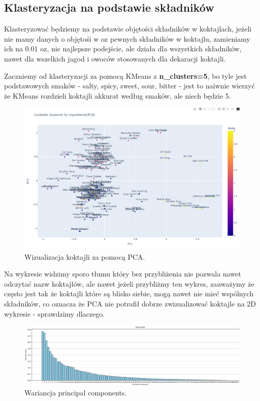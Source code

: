 \documentclass{article}
\begin{document}
\subsection{Klasteryzacja na podstawie składników}
Klasteryzować będziemy na podstawie objętości składników w koktajlach, jeżeli nie mamy danych o objętośi w oz pewnych składników w koktajlu, zamieniamy ich na 0.01 oz, nie najlepsze podejście, ale działa dla wszystkich składników, nawet dla wszelkich jagod i owoców stosowanych dla dekaracji koktajli.

\newline

Zaczniemy od klasteryzacji za pomocą KMeans z \textbf{n\_clusters=5}, bo tyle jest podstawowych smaków - salty, spicy, sweet, sour, bitter - jest to naiwnie wierzyć że KMeans rozdzieli koktajli akkurat według smaków, ale niech będzie 5.
\begin{figure}[h]
\centering
    \includegraphics[width=1\linewidth]{cluster_1.png}
    \caption{Wizualizacja koktajli za pomocą PCA.}
\end{figure}

Na wykresie widzimy sporo tłumu który bez przybliżenia nie pozwala nawet odczytać nazw koktajlów, ale nawet jeżeli przybliżmy ten wykres, zauważymy że często jest tak że koktajli które są blisko siebie, mogą nawet nie mieć wspólnych składników, co oznacza że PCA nie potrafił dobrze zwizualizować koktajle na 2D wykresie - sprawdzimy dlaczego.

\clearpage

\begin{figure}[h]
\centering
    \includegraphics[width=1\linewidth]{cluster_2.png}
    \caption{Wariancja principal components.}
\end{figure}
\end{document}
